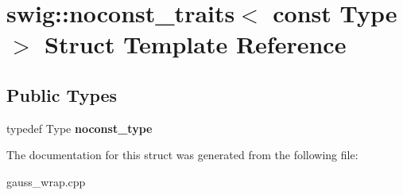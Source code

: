 \hypertarget{structswig_1_1noconst__traits_3_01const_01_type_01_4}{\section{swig\-:\-:noconst\-\_\-traits$<$ const Type $>$ Struct Template Reference}
\label{structswig_1_1noconst__traits_3_01const_01_type_01_4}
}
\subsection*{Public Types}
\begin{DoxyCompactItemize}
\item 
\hypertarget{structswig_1_1noconst__traits_3_01const_01_type_01_4_a47a8b24d65b72185304a9e51211f721f}{typedef Type {\bfseries noconst\-\_\-type}}\label{structswig_1_1noconst__traits_3_01const_01_type_01_4_a47a8b24d65b72185304a9e51211f721f}

\end{DoxyCompactItemize}


The documentation for this struct was generated from the following file\-:\begin{DoxyCompactItemize}
\item 
gauss\-\_\-wrap.\-cpp\end{DoxyCompactItemize}
